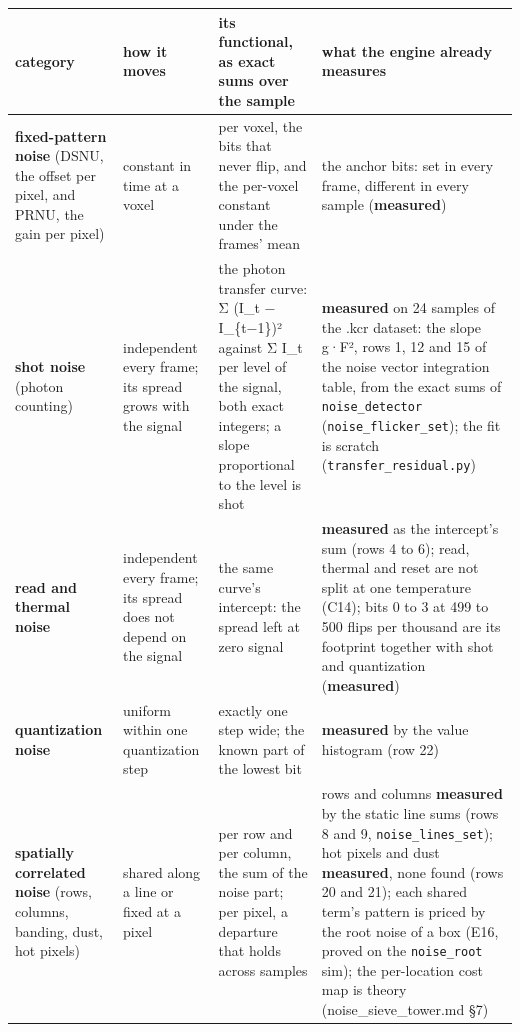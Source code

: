 {\footnotesize
\setlength{\tabcolsep}{6pt}
\begin{longtable}{>{\RaggedRight\arraybackslash}p{}>{\RaggedRight\arraybackslash}p{}>{\RaggedRight\arraybackslash}p{}>{\RaggedRight\arraybackslash}p{}}
\toprule
category & how it moves & its functional, as exact sums over the sample & what the engine already measures \\
\midrule
\endhead
\textbf{fixed-pattern noise} (DSNU, the offset per pixel, and PRNU, the gain per pixel) & constant in time at a voxel & per voxel, the bits that never flip, and the per-voxel constant under the frames' mean & the anchor bits: set in every frame, different in every sample (\textbf{measured}) \\
\textbf{shot noise} (photon counting) & independent every frame; its spread grows with the signal & the photon transfer curve: Σ (I\_\allowbreak{}t − I\_\allowbreak{}\{t−1\})² against Σ I\_\allowbreak{}t per level of the signal, both exact integers; a slope proportional to the level is shot & \textbf{measured} on 24 samples of the .kcr dataset: the slope g·F², rows 1, 12 and 15 of the noise vector integration table, from the exact sums of \texttt{noise\_\allowbreak{}detector} (\texttt{noise\_\allowbreak{}flicker\_\allowbreak{}set}); the fit is scratch (\texttt{transfer\_\allowbreak{}residual.\allowbreak{}py}) \\
\textbf{read and thermal noise} & independent every frame; its spread does not depend on the signal & the same curve's intercept: the spread left at zero signal & \textbf{measured} as the intercept's sum (rows 4 to 6); read, thermal and reset are not split at one temperature (C14); bits 0 to 3 at 499 to 500 flips per thousand are its footprint together with shot and quantization (\textbf{measured}) \\
\textbf{quantization noise} & uniform within one quantization step & exactly one step wide; the known part of the lowest bit & \textbf{measured} by the value histogram (row 22) \\
\textbf{spatially correlated noise} (rows, columns, banding, dust, hot pixels) & shared along a line or fixed at a pixel & per row and per column, the sum of the noise part; per pixel, a departure that holds across samples & rows and columns \textbf{measured} by the static line sums (rows 8 and 9, \texttt{noise\_\allowbreak{}lines\_\allowbreak{}set}); hot pixels and dust \textbf{measured}, none found (rows 20 and 21); each shared term's pattern is priced by the root noise of a box (E16, proved on the \texttt{noise\_\allowbreak{}root} sim); the per-location cost map is theory (noise\_\allowbreak{}sieve\_\allowbreak{}tower.md §7) \\
\bottomrule
\end{longtable}
}

